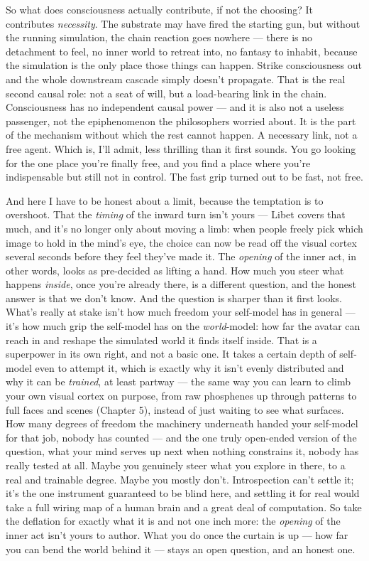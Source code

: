 \documentclass[11pt, twoside, openright]{book}
\begin{document}
So what does consciousness actually contribute, if not the choosing? It contributes \textit{necessity}. The substrate may have fired the starting gun, but without the running simulation, the chain reaction goes nowhere --- there is no detachment to feel, no inner world to retreat into, no fantasy to inhabit, because the simulation is the only place those things can happen. Strike consciousness out and the whole downstream cascade simply doesn't propagate. That is the real second causal role: not a seat of will, but a load-bearing link in the chain. Consciousness has no independent causal power --- and it is also not a useless passenger, not the epiphenomenon the philosophers worried about. It is the part of the mechanism without which the rest cannot happen. A necessary link, not a free agent. Which is, I'll admit, less thrilling than it first sounds. You go looking for the one place you're finally free, and you find a place where you're indispensable but still not in control. The fast grip turned out to be fast, not free.

And here I have to be honest about a limit, because the temptation is to overshoot. That the \textit{timing} of the inward turn isn't yours --- Libet covers that much, and it's no longer only about moving a limb: when people freely pick which image to hold in the mind's eye, the choice can now be read off the visual cortex several seconds before they feel they've made it. The \textit{opening} of the inner act, in other words, looks as pre-decided as lifting a hand. How much you steer what happens \textit{inside}, once you're already there, is a different question, and the honest answer is that we don't know. And the question is sharper than it first looks. What's really at stake isn't how much freedom your self-model has in general --- it's how much grip the self-model has on the \textit{world}-model: how far the avatar can reach in and reshape the simulated world it finds itself inside. That is a superpower in its own right, and not a basic one. It takes a certain depth of self-model even to attempt it, which is exactly why it isn't evenly distributed and why it can be \textit{trained}, at least partway --- the same way you can learn to climb your own visual cortex on purpose, from raw phosphenes up through patterns to full faces and scenes (Chapter 5), instead of just waiting to see what surfaces. How many degrees of freedom the machinery underneath handed your self-model for that job, nobody has counted --- and the one truly open-ended version of the question, what your mind serves up next when nothing constrains it, nobody has really tested at all. Maybe you genuinely steer what you explore in there, to a real and trainable degree. Maybe you mostly don't. Introspection can't settle it; it's the one instrument guaranteed to be blind here, and settling it for real would take a full wiring map of a human brain and a great deal of computation. So take the deflation for exactly what it is and not one inch more: the \textit{opening} of the inner act isn't yours to author. What you do once the curtain is up --- how far you can bend the world behind it --- stays an open question, and an honest one.
\end{document}
